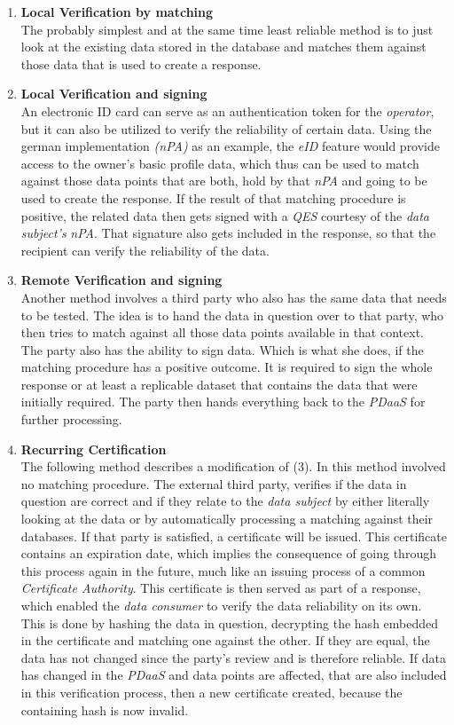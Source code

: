 \documentclass[12pt,english,a4paper,titlepage,cleardoublepage=empty,dottedtoc]{report}
\begin{document}
\begin{enumerate}
\def\labelenumi{(\arabic{enumi})}
\item
  \textbf{Local Verification by matching}\\
  The probably simplest and at the same time least reliable method is to
  just look at the existing data stored in the database and matches them
  against those data that is used to create a response.
\item
  \textbf{Local Verification and signing}\\
  An electronic ID card can serve as an authentication token for the
  \emph{operator}, but it can also be utilized to verify the reliability
  of certain data. Using the german implementation \emph{(nPA)} as an
  example, the \emph{eID} feature would provide access to the owner's
  basic profile data, which thus can be used to match against those data
  points that are both, hold by that \emph{nPA} and going to be used to
  create the response. If the result of that matching procedure is
  positive, the related data then gets signed with a \emph{QES} courtesy
  of the \emph{data subject's} \emph{nPA}. That signature also gets
  included in the response, so that the recipient can verify the
  reliability of the data.
\item
  \textbf{Remote Verification and signing}\\
  Another method involves a third party who also has the same data that
  needs to be tested. The idea is to hand the data in question over to
  that party, who then tries to match against all those data points
  available in that context. The party also has the ability to sign
  data. Which is what she does, if the matching procedure has a positive
  outcome. It is required to sign the whole response or at least a
  replicable dataset that contains the data that were initially
  required. The party then hands everything back to the \emph{PDaaS} for
  further processing.
\item
  \textbf{Recurring Certification}\\
  The following method describes a modification of (3). In this method
  involved no matching procedure. The external third party, verifies if
  the data in question are correct and if they relate to the \emph{data
  subject} by either literally looking at the data or by automatically
  processing a matching against their databases. If that party is
  satisfied, a certificate will be issued. This certificate contains an
  expiration date, which implies the consequence of going through this
  process again in the future, much like an issuing process of a common
  \emph{Certificate Authority}. This certificate is then served as part
  of a response, which enabled the \emph{data consumer} to verify the
  data reliability on its own. This is done by hashing the data in
  question, decrypting the hash embedded in the certificate and matching
  one against the other. If they are equal, the data has not changed
  since the party's review and is therefore reliable. If data has
  changed in the \emph{PDaaS} and data points are affected, that are
  also included in this verification process, then a new certificate
  created, because the containing hash is now invalid.
\end{enumerate}
\end{document}
